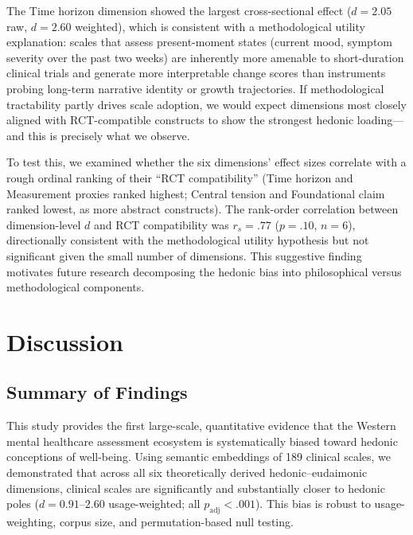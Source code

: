 \documentclass[12pt,a4paper]{article}
\begin{document}
The Time horizon dimension showed the largest cross-sectional effect ($d = 2.05$ raw, $d = 2.60$ weighted), which is consistent with a methodological utility explanation: scales that assess present-moment states (current mood, symptom severity over the past two weeks) are inherently more amenable to short-duration clinical trials and generate more interpretable change scores than instruments probing long-term narrative identity or growth trajectories.
If methodological tractability partly drives scale adoption, we would expect dimensions most closely aligned with RCT-compatible constructs to show the strongest hedonic loading---and this is precisely what we observe.

To test this, we examined whether the six dimensions' effect sizes correlate with a rough ordinal ranking of their ``RCT compatibility'' (Time horizon and Measurement proxies ranked highest; Central tension and Foundational claim ranked lowest, as more abstract constructs).
The rank-order correlation between dimension-level $d$ and RCT compatibility was $r_s = .77$ ($p = .10$, $n = 6$), directionally consistent with the methodological utility hypothesis but not significant given the small number of dimensions.
This suggestive finding motivates future research decomposing the hedonic bias into philosophical versus methodological components.

\section{Discussion}\label{sec:discussion}

\subsection{Summary of Findings}

This study provides the first large-scale, quantitative evidence that the Western mental healthcare assessment ecosystem is systematically biased toward hedonic conceptions of well-being.
Using semantic embeddings of 189 clinical scales, we demonstrated that across all six theoretically derived hedonic--eudaimonic dimensions, clinical scales are significantly and substantially closer to hedonic poles ($d = 0.91$--$2.60$ usage-weighted; all $p_{\text{adj}} < .001$).
This bias is robust to usage-weighting, corpus size, and permutation-based null testing.
\end{document}
